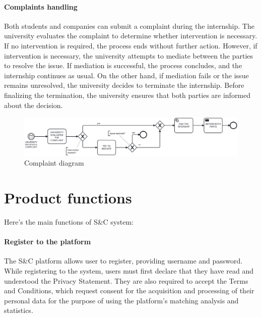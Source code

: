 \paragraph{Complaints handling} Both students and companies can submit a complaint during the internship. The university evaluates the complaint to determine whether intervention is necessary. If no intervention is required, the process ends without further action. However, if intervention is necessary, the university attempts to mediate between the parties to resolve the issue. If mediation is successful, the process concludes, and the internship continues as usual. On the other hand, if mediation fails or the issue remains unresolved, the university decides to terminate the internship. Before finalizing the termination, the university ensures that both parties are informed about the decision.

\begin{figure}[H]
    \centering
    \includegraphics[width=1\linewidth]{Images//state diagrams/COMPLAINTS.png}
    \caption{Complaint diagram}
    \label{fig:enter-label}
\end{figure}

\section{Product functions}
\label{sec:product_functions}%

Here's the main functions of S\&C system:

\paragraph{Register to the platform}
The S\&C platform allows user to register, providing username and password. While registering to the system, users must first declare that they have read and understood the Privacy Statement. They are also required to accept the Terms and Conditions, which request consent for the acquisition and processing of their personal data for the purpose of using the platform's matching analysis and statistics.

